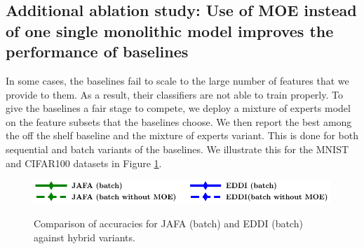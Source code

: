 \documentclass[letterpaper]{article}
\begin{document}
\subsection{Additional ablation study: Use of MOE instead of one single monolithic model improves the performance of baselines}
In some cases, the baselines fail to scale to the large number of features that we provide to them. As a result, their classifiers are not able to train properly. To give the baselines a fair stage to compete, we deploy a mixture of experts model on the feature subsets that the baselines choose. We then report the best among the off the shelf baseline and the mixture of experts variant. This is done for both sequential and batch variants of the baselines. We illustrate this for the MNIST and CIFAR100 datasets in Figure \ref{fig:hybrid}.
\begin{figure}[h]
    \centering
      \includegraphics[width=0.5\linewidth]{FIG/legend_hybrid_mnist.pdf}\\[-1ex]
\caption{Comparison of accuracies for JAFA (batch) and EDDI (batch) against hybrid variants.}
    \label{fig:hybrid}
\end{figure}



\end{document}
